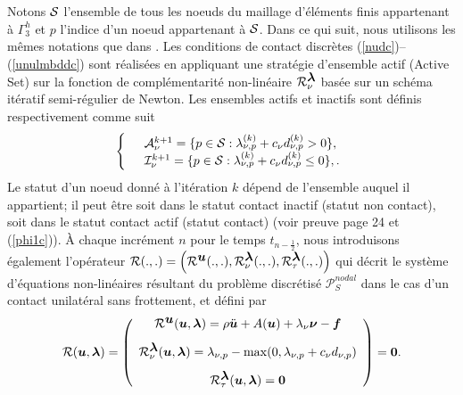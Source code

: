 Notons ${\cal S}$  l'ensemble de tous les noeuds du maillage d'éléments finis appartenant à $\Gamma_3^h$ et $p$ l'indice d'un noeud appartenant à ${\cal S}$. Dans ce qui suit, nous utilisons les mêmes notations que dans \cite{hueber2008primal}. Les conditions de contact discrètes (\ref{nudc})--(\ref{unulmbddc}) sont réalisées en appliquant une stratégie d'ensemble actif (Active Set) sur la fonction de complémentarité non-linéaire ${\cal R}_{\nu}^{\mbox{\boldmath{$\lambda$}}}$ basée sur un schéma itératif semi-régulier de Newton. Les ensembles actifs et inactifs sont définis respectivement comme suit
\begin{align}
\left\{\begin{array}{ll}
&{\cal A}_{\nu}^{k+1}=\{p\in {\cal S}:\lambda^{(k)}_{\nu,p}+c_{\nu} d^{(k)}_{\nu,p}> 0\},\\
&{\cal I}_{\nu}^{k+1}=\{p\in {\cal S}:\lambda^{(k)}_{\nu,p}+c_{\nu} d^{(k)}_{\nu,p} \le 0\},.
\end{array}\right.
\label{ensactinact}
\end{align}
Le statut d'un noeud donné à l'itération $k$ dépend de l'ensemble auquel il appartient; il peut être soit dans le statut contact inactif (statut non contact), soit dans le statut contact actif (statut contact) (voir preuve page 24 et (\ref{phi1c})). À chaque incrément $n$ pour le temps $t_{n-\frac{1}{2}}$, nous introduisons également l'opérateur ${\cal R}(.,.)=\left({\cal R}^{\mbox{\boldmath{$u$}}}(.,.),{\cal R}_{\nu}^{\mbox{\boldmath{$\lambda$}}}(.,.),{\cal R}_{\tau}^{\mbox{\boldmath{$\lambda$}}}(.,.)\right)$ qui décrit le système d'équations non-linéaires résultant du problème discrétisé ${\mathcal P}_S^{nodal}$ dans le cas d'un contact unilatéral sans frottement, et défini par
\begin{equation}
\label{Rsystem1}
{\cal R}(\mbox{\boldmath{$u$}},\mbox{\boldmath{$\lambda$}})=\left(
\begin{array}{c}
{\cal R}^{\mbox{\boldmath{$u$}}}(\mbox{\boldmath{$u$}},\mbox{\boldmath{$\lambda$}})=\rho\ddot{\mbox{\boldmath{$u$}}} + A(\mbox{\boldmath{$u$}}) + \lambda_{\nu}\mbox{\boldmath{$\nu$}} - \mbox{\boldmath{$f$}}\\[3mm]
{\cal R}_{\nu}^{\mbox{\boldmath{$\lambda$}}}(\mbox{\boldmath{$u$}},\mbox{\boldmath{$\lambda$}})=\lambda_{\nu, p}-\max(0,\lambda_{\nu, p}+c_{\nu}d_{\nu,p})\\[3mm]
{\cal R}_{\tau}^{\mbox{\boldmath{$\lambda$}}}(\mbox{\boldmath{$u$}},\mbox{\boldmath{$\lambda$}}) = \mbox{\boldmath{$0$}}
\end{array}\right) = \mbox{\boldmath{$0$}}.
\end{equation}


